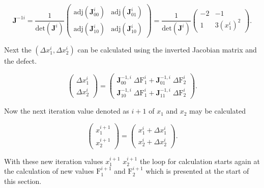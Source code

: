 \documentclass[a4paper, twoside, 11pt]{article}
\begin{document}
    \begin{equation}
        \textbf{J}^{-1i} =
        \frac{1}{\text{det}(\textbf{J}^i)}
        \begin{pmatrix}
            \text{adj}(\textbf{J}^i_{00}) & \text{adj}(\textbf{J}^i_{01})\\
            \text{adj}(\textbf{J}^i_{10}) & \text{adj}(\textbf{J}^i_{10})
        \end{pmatrix}
        =
        \frac{1}{\text{det}(\textbf{J}^i)}
        \begin{pmatrix}
            -2 & -1\\
            1 & 3 (x_1^i)^2
        \end{pmatrix}.
    \end{equation}
\par
    Next the $(\Delta x_1^i, \Delta x_2^i)$ can be calculated using the inverted Jacobian matrix and the defect.

    \begin{equation}
        \begin{pmatrix}
            \Delta x_1^i \\
            \Delta x_2^i
        \end{pmatrix}
        =
        \begin{pmatrix}
            \textbf{J}_{00}^{-1,i} \;\Delta \text{F}_1^i + \textbf{J}_{01}^{-1,i} \;\Delta \text{F}_2^i\\ 
            \textbf{J}_{10}^{-1,i} \;\Delta \text{F}_1^i + \textbf{J}_{11}^{-1,i} \;\Delta \text{F}_2^i
        \end{pmatrix}.
    \end{equation}

    \par
    Now the next iteration value denoted as $i+1$ of $x_1$ and $x_2$ may be calculated

    \begin{equation}
        \begin{pmatrix}
            x_1^{i+1}\\
            x_2^{i+1}
        \end{pmatrix}
        =
        \begin{pmatrix}
            x_1^i + \Delta x_1^i\\
            x_2^i + \Delta x_2^i
        \end{pmatrix}.
    \end{equation}
\par
    With these new iteration values $x_1^{i+1}$ $x_2^{i+1}$ the loop for calculation starts again at the calculation of new values $\text{F}_1^{i+1}$ and $\text{F}_2^{i+1}$ which is presented at the start of this section.
\end{document}

